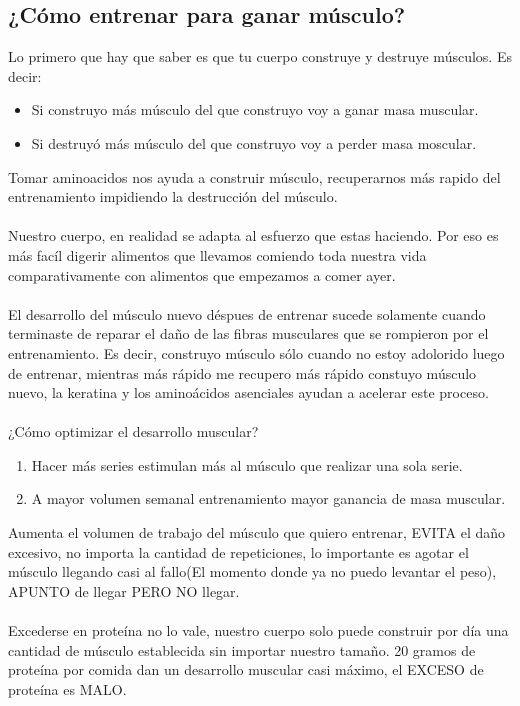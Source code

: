 \documentclass{article}
\begin{document}
\subsection{¿Cómo entrenar para ganar músculo?}
Lo primero que hay que saber es que tu cuerpo construye y destruye músculos. Es decir:
\begin{itemize}
    \item Si construyo más músculo del que construyo voy a ganar masa muscular.
    \item Si destruyó más músculo del que construyo voy a perder masa moscular.
\end{itemize}
Tomar aminoacidos nos ayuda a construir músculo, recuperarnos más rapido del entrenamiento impidiendo la destrucción del músculo.\\
\\
Nuestro cuerpo, en realidad se adapta al esfuerzo que estas haciendo. Por eso es más facíl digerir alimentos que llevamos comiendo toda nuestra vida comparativamente con alimentos que empezamos a comer ayer.\\
\\
El desarrollo del músculo nuevo déspues de entrenar sucede solamente cuando terminaste de reparar el daño de las fibras musculares que se rompieron por el entrenamiento. Es decir, construyo músculo sólo cuando no estoy adolorido luego de entrenar, mientras más rápido me recupero más rápido constuyo músculo nuevo, la keratina y los aminoácidos asenciales ayudan a acelerar este proceso.\\
\\
¿Cómo optimizar el desarrollo muscular?
\begin{enumerate}
    \item Hacer más series estimulan más al músculo que realizar una sola serie. 
    
    \item A mayor volumen semanal entrenamiento mayor ganancia de masa muscular.
\end{enumerate}
Aumenta el volumen de trabajo del músculo que quiero entrenar, EVITA el daño excesivo, no importa la cantidad de repeticiones, lo importante es agotar el músculo llegando casi al fallo(El momento donde ya no puedo levantar el peso), APUNTO de llegar PERO NO llegar.\\
\\
Excederse en proteína no lo vale, nuestro cuerpo solo puede construir por día una cantidad de músculo establecida sin importar nuestro tamaño. 20 gramos de proteína por comida dan un desarrollo muscular casi máximo, el EXCESO de proteína es MALO.\\
\end{document}

